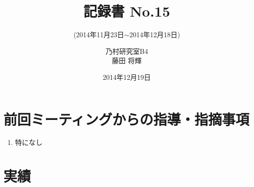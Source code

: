\documentclass[fleqn, 14pt]{extarticle}
\subtitle{(2014年11月23日$\sim$2014年12月18日)}
\author{乃村研究室B4\\藤田 将輝}
\date{2014年12月19日}
\title{記録書 No.15}
\begin{document}
\maketitle
\section{前回ミーティングからの指導・指摘事項}
\label{sec-1}
\begin{enumerate}
\item 特になし
\newline
\hfill

\end{enumerate}




\section{実績}
\label{sec-2}
\end{document}
